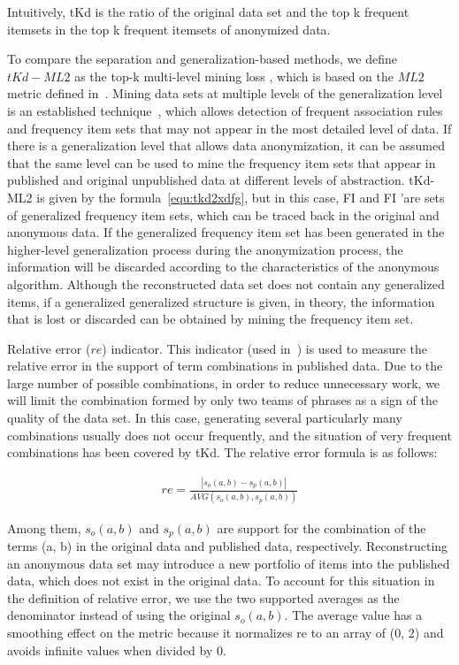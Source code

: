 \documentclass[journal,transmag]{IEEEtran}
\begin{document}
Intuitively, tKd is the ratio of the original data set and the top k frequent itemsets in the top k frequent itemsets of anonymized data.

To compare the separation and generalization-based methods, we define $ tKd-ML2 $ as the top-k multi-level mining loss , which is based on the $ ML2 $ metric defined in~\cite{terrovitis2008privacy}. Mining data sets at multiple levels of the generalization level is an established technique~\cite{han1995discovery}, which allows detection of frequent association rules and frequency item sets that may not appear in the most detailed level of data. If there is a generalization level that allows data anonymization, it can be assumed that the same level can be used to mine the frequency item sets that appear in published and original unpublished data at different levels of abstraction. tKd-ML2 is given by the formula~\ref{equ:tkd2xdfg}, but in this case, FI and FI 'are sets of generalized frequency item sets, which can be traced back in the original and anonymous data. If the generalized frequency item set has been generated in the higher-level generalization process during the anonymization process, the information will be discarded according to the characteristics of the anonymous algorithm. Although the reconstructed data set does not contain any generalized items, if a generalized generalized structure is given, in theory, the information that is lost or discarded can be obtained by mining the frequency item set.

Relative error ($ re $) indicator. This indicator (used in~\cite{chen2011publishing}) is used to measure the relative error in the support of term combinations in published data. Due to the large number of possible combinations, in order to reduce unnecessary work, we will limit the combination formed by only two teams of phrases as a sign of the quality of the data set. In this case, generating several particularly many combinations usually does not occur frequently, and the situation of very frequent combinations has been covered by tKd. The relative error formula is as follows:

\begin{eqnarray}
re = \frac{|s_o(a,b) - s_p(a,b)|}{AVG(s_o(a,b),s_p(a,b))} 
\end{eqnarray}\label{re2}

Among them, $ s_o (a, b) $ and $ s_p (a, b) $ are support for the combination of the terms (a, b) in the original data and published data, respectively. Reconstructing an anonymous data set may introduce a new portfolio of items into the published data, which does not exist in the original data. To account for this situation in the definition of relative error, we use the two supported averages as the denominator instead of using the original $ s_o (a, b) $. The average value has a smoothing effect on the metric because it normalizes re to an array of (0, 2) and avoids infinite values when divided by 0.
\end{document}
